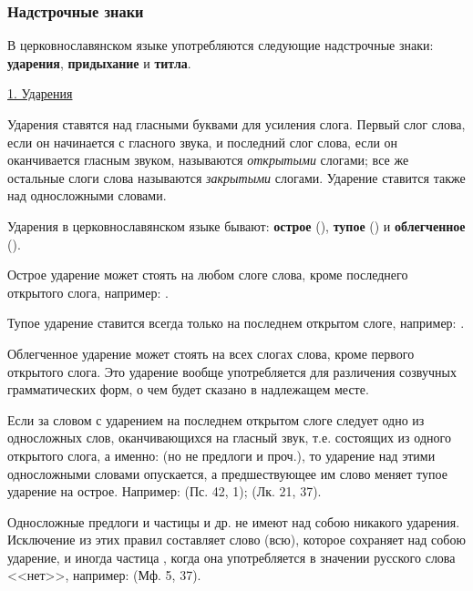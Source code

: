 \documentclass[11pt,a4paper,oneside]{memoir}
\begin{document}
                \subsubsection{Надстрочные знаки}

    В церковнославянском языке употребляются следующие надстрочные знаки: \textbf{ударения}, \textbf{придыхание} и \textbf{титла}.

    \medskip
    \underline{1. Ударения}    
    \medskip

    Ударения ставятся над гласными буквами для усиления слога. Первый слог слова, если он начинается с гласного звука, и последний слог слова, если он оканчивается гласным звуком, называются \emph{открытыми} слогами; все же остальные слоги слова называются \emph{закрытыми} слогами. Ударение ставится также над односложными словами.
    
    Ударения в церковнославянском языке бывают: \textbf{острое} ({}), \textbf{тупое} ({}) и \textbf{облегченное} ({}).
    
    Острое ударение может стоять на любом слоге слова, кроме последнего открытого слога, например: {}.
    
    Тупое ударение ставится всегда только на последнем открытом слоге, например: {}.
    
    Облегченное ударение может стоять на всех слогах слова, кроме первого открытого слога. Это ударение вообще употребляется для различения созвучных грамматических форм, о чем будет сказано в надлежащем месте.
    
    Если за словом с ударением на последнем открытом слоге следует одно из односложных слов, оканчивающихся на гласный звук, т.е. состоящих из одного открытого слога, а именно: {} (но не предлоги {} и проч.), то ударение над этими односложными словами опускается, а предшествующее им слово меняет тупое ударение на острое. Например: {} (Пс. 42, 1); {} (Лк. 21, 37).
    
    Односложные предлоги и частицы {} и др. не имеют над собою никакого ударения. Исключение из этих правил составляет слово {} (всю), которое сохраняет над собою ударение, и иногда частица {}, когда она употребляется в значении русского слова <<нет>>, например: {} (Мф. 5, 37).
    
\end{document}

